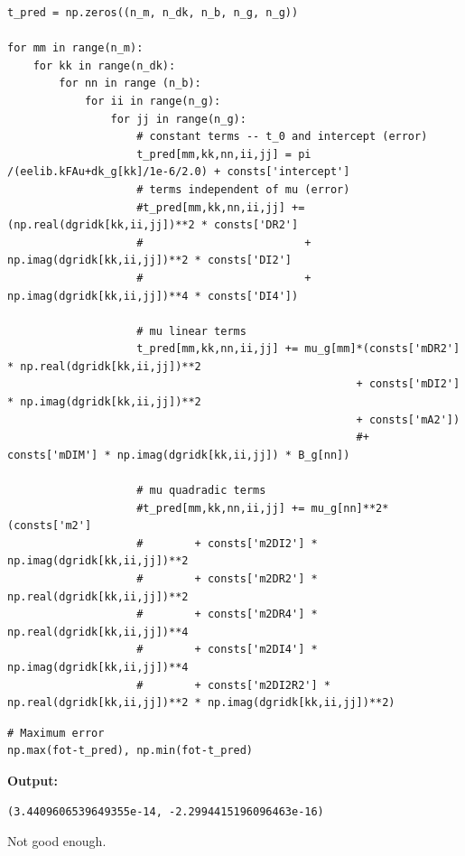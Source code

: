 \documentclass{article}
\begin{document}
\begin{lstlisting}
t_pred = np.zeros((n_m, n_dk, n_b, n_g, n_g))

for mm in range(n_m): 
    for kk in range(n_dk):
        for nn in range (n_b):
            for ii in range(n_g):
                for jj in range(n_g):
                    # constant terms -- t_0 and intercept (error)
                    t_pred[mm,kk,nn,ii,jj] = pi /(eelib.kFAu+dk_g[kk]/1e-6/2.0) + consts['intercept']
                    # terms independent of mu (error)
                    #t_pred[mm,kk,nn,ii,jj] += (np.real(dgridk[kk,ii,jj])**2 * consts['DR2'] 
                    #                         + np.imag(dgridk[kk,ii,jj])**2 * consts['DI2'] 
                    #                         + np.imag(dgridk[kk,ii,jj])**4 * consts['DI4'])

                    # mu linear terms
                    t_pred[mm,kk,nn,ii,jj] += mu_g[mm]*(consts['mDR2'] * np.real(dgridk[kk,ii,jj])**2
                                                      + consts['mDI2'] * np.imag(dgridk[kk,ii,jj])**2
                                                      + consts['mA2'])
                                                      #+ consts['mDIM'] * np.imag(dgridk[kk,ii,jj]) * B_g[nn])

                    # mu quadradic terms
                    #t_pred[mm,kk,nn,ii,jj] += mu_g[nn]**2*(consts['m2']
                    #        + consts['m2DI2'] * np.imag(dgridk[kk,ii,jj])**2
                    #        + consts['m2DR2'] * np.real(dgridk[kk,ii,jj])**2 
                    #        + consts['m2DR4'] * np.real(dgridk[kk,ii,jj])**4 
                    #        + consts['m2DI4'] * np.imag(dgridk[kk,ii,jj])**4
                    #        + consts['m2DI2R2'] * np.real(dgridk[kk,ii,jj])**2 * np.imag(dgridk[kk,ii,jj])**2)
                    \end{lstlisting}

\begin{lstlisting}
# Maximum error
np.max(fot-t_pred), np.min(fot-t_pred)\end{lstlisting}

\textbf{Output:}\begin{verbatim}
(3.4409606539649355e-14, -2.2994415196096463e-16)
\end{verbatim}

Not good enough.
\end{document}
